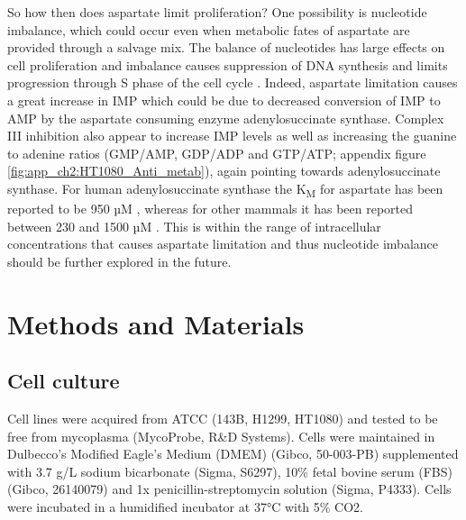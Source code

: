 So how then does aspartate limit proliferation?
One possibility is nucleotide imbalance, which could occur even when metabolic fates of aspartate are provided through a salvage mix.
The balance of nucleotides has large effects on cell proliferation and imbalance causes suppression of DNA synthesis and limits progression through S phase of the cell cycle \cite{Diehl2022-gm}.
Indeed, aspartate limitation causes a great increase in IMP \cite{Sullivan2015-xf} which could be due to decreased conversion of IMP to AMP by the aspartate consuming enzyme adenylosuccinate synthase.
Complex III inhibition also appear to increase IMP levels as well as increasing the guanine to adenine ratios (GMP/AMP, GDP/ADP and GTP/ATP; appendix figure \ref{fig:app_ch2:HT1080_Anti_metab}), again pointing towards adenylosuccinate synthase.
For human adenylosuccinate synthase the K\textsubscript{M} for aspartate has been reported to be 950 µM \cite{Van_der_Weyden1974-eq}, whereas for other mammals it has been reported between 230 and 1500 µM \cite{Stayton1983-ao}.
This is within the range of intracellular concentrations that causes aspartate limitation and thus nucleotide imbalance should be further explored in the future.




\section{Methods and Materials}
\subsection{Cell culture}
Cell lines were acquired from ATCC (143B, H1299, HT1080) and tested to be free from mycoplasma (MycoProbe, R\&D Systems).
Cells were maintained in Dulbecco’s Modified Eagle’s Medium (DMEM) (Gibco, 50-003-PB) supplemented with 3.7 g/L sodium bicarbonate (Sigma, S6297), 10\% fetal bovine serum (FBS) (Gibco, 26140079) and 1x penicillin-streptomycin solution (Sigma, P4333).
Cells were incubated in a humidified incubator at 37°C with 5\% CO2.


